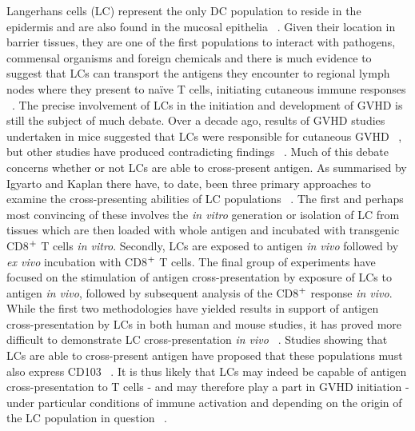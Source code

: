 Langerhans cells (LC) represent the only DC population to reside in the epidermis and are also found in the mucosal epithelia ~\autocite{Igy2013,Kis2005}. Given their location in barrier tissues, they are one of the first populations to interact with pathogens, commensal organisms and foreign chemicals and there is much evidence to suggest that LCs can transport the antigens they encounter to regional lymph nodes where they present to na\"ive T cells, initiating cutaneous immune responses ~\autocite{Igy2013}. The precise involvement of LCs in the initiation and development of GVHD is still the subject of much debate. Over a decade ago, results of GVHD studies undertaken in mice suggested that LCs were responsible for cutaneous GVHD ~\autocite{Mer2004}, but other studies have produced contradicting findings ~\autocite{All2003,Car2004}. Much of this debate concerns whether or not LCs are able to cross-present antigen. As summarised by Igyarto and Kaplan there have, to date, been three primary approaches to examine the cross-presenting abilities of LC populations ~\autocite{Igy2013}. The first and perhaps most convincing of these involves the \textit{in vitro} generation or isolation of LC from tissues which are then loaded with whole antigen and incubated with transgenic CD8$\textsuperscript{+}$ T cells \textit{in vitro}. Secondly, LCs are exposed to antigen \textit{in vivo} followed by \textit{ex vivo} incubation with CD8$\textsuperscript{+}$ T cells. The final group of experiments have focused on the stimulation of antigen cross-presentation by exposure of LCs to antigen \textit{in vivo}, followed by subsequent analysis of the CD8$\textsuperscript{+}$ response \textit{in vivo}. While the first two methodologies have yielded results in support of antigen cross-presentation by LCs in both human and mouse studies, it has proved more difficult to demonstrate LC cross-presentation \textit{in vivo} ~\autocite{Igy2013}. Studies showing that LCs are able to cross-present antigen have proposed that these populations must also express CD103 ~\autocite{Bob2010}. It is thus likely that LCs may indeed be capable of antigen cross-presentation to T cells - and may therefore play a part in GVHD initiation - under particular conditions of immune activation and depending on the origin of the LC population in question ~\autocite{Igy2013}.


